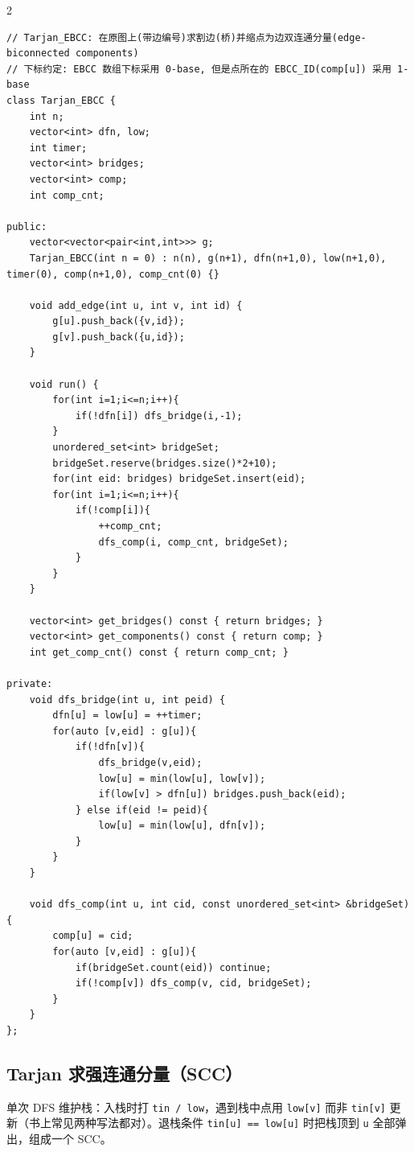 \begin{multicols*}{2}
		\begin{verbatim}
// Tarjan_EBCC: 在原图上(带边编号)求割边(桥)并缩点为边双连通分量(edge-biconnected components)
// 下标约定: EBCC 数组下标采用 0-base, 但是点所在的 EBCC_ID(comp[u]) 采用 1-base
class Tarjan_EBCC {
    int n;
    vector<int> dfn, low;
    int timer;
    vector<int> bridges;
    vector<int> comp;
    int comp_cnt;

public:
    vector<vector<pair<int,int>>> g;
    Tarjan_EBCC(int n = 0) : n(n), g(n+1), dfn(n+1,0), low(n+1,0), timer(0), comp(n+1,0), comp_cnt(0) {}

    void add_edge(int u, int v, int id) {
        g[u].push_back({v,id});
        g[v].push_back({u,id});
    }

    void run() {
        for(int i=1;i<=n;i++){
            if(!dfn[i]) dfs_bridge(i,-1);
        }
        unordered_set<int> bridgeSet;
        bridgeSet.reserve(bridges.size()*2+10);
        for(int eid: bridges) bridgeSet.insert(eid);
        for(int i=1;i<=n;i++){
            if(!comp[i]){
                ++comp_cnt;
                dfs_comp(i, comp_cnt, bridgeSet);
            }
        }
    }

    vector<int> get_bridges() const { return bridges; }
    vector<int> get_components() const { return comp; }
    int get_comp_cnt() const { return comp_cnt; }

private:
    void dfs_bridge(int u, int peid) {
        dfn[u] = low[u] = ++timer;
        for(auto [v,eid] : g[u]){
            if(!dfn[v]){
                dfs_bridge(v,eid);
                low[u] = min(low[u], low[v]);
                if(low[v] > dfn[u]) bridges.push_back(eid);
            } else if(eid != peid){
                low[u] = min(low[u], dfn[v]);
            }
        }
    }

    void dfs_comp(int u, int cid, const unordered_set<int> &bridgeSet) {
        comp[u] = cid;
        for(auto [v,eid] : g[u]){
            if(bridgeSet.count(eid)) continue;
            if(!comp[v]) dfs_comp(v, cid, bridgeSet);
        }
    }
};
		\end{verbatim}


		\subsection{Tarjan 求强连通分量（SCC）}

		单次 DFS 维护栈：入栈时打 \texttt{tin / low}，遇到栈中点用 \texttt{low[v]} 而非 \texttt{tin[v]} 更新（书上常见两种写法都对）。退栈条件 \texttt{tin[u] == low[u]} 时把栈顶到 \texttt{u} 全部弹出，组成一个 SCC。


\end{multicols*}
